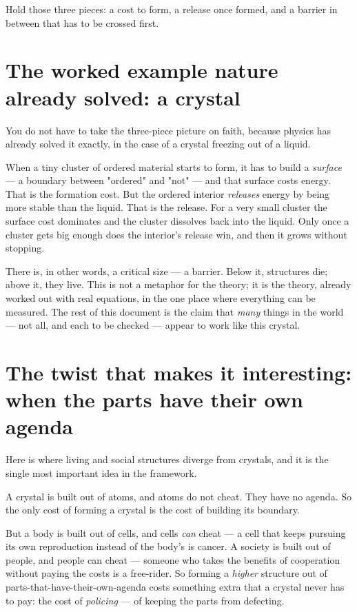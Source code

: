 \documentclass{article}
\begin{document}
Hold those three pieces: a cost to form, a release once formed, and a barrier in between that has to be crossed first.

\section{The worked example nature already solved: a crystal}

You do not have to take the three-piece picture on faith, because physics has already solved it exactly, in the case of a crystal freezing out of a liquid.

When a tiny cluster of ordered material starts to form, it has to build a \textit{surface} --- a boundary between "ordered" and "not" --- and that surface costs energy. That is the formation cost. But the ordered interior \textit{releases} energy by being more stable than the liquid. That is the release. For a very small cluster the surface cost dominates and the cluster dissolves back into the liquid. Only once a cluster gets big enough does the interior's release win, and then it grows without stopping.

There is, in other words, a critical size --- a barrier. Below it, structures die; above it, they live. This is not a metaphor for the theory; it is the theory, already worked out with real equations, in the one place where everything can be measured. The rest of this document is the claim that \textit{many} things in the world --- not all, and each to be checked --- appear to work like this crystal.

\section{The twist that makes it interesting: when the parts have their own agenda}

Here is where living and social structures diverge from crystals, and it is the single most important idea in the framework.

A crystal is built out of atoms, and atoms do not cheat. They have no agenda. So the only cost of forming a crystal is the cost of building its boundary.

But a body is built out of cells, and cells \textit{can} cheat --- a cell that keeps pursuing its own reproduction instead of the body's is cancer. A society is built out of people, and people can cheat --- someone who takes the benefits of cooperation without paying the costs is a free-rider. So forming a \textit{higher} structure out of parts-that-have-their-own-agenda costs something extra that a crystal never has to pay: the cost of \textit{policing} --- of keeping the parts from defecting.
\end{document}
